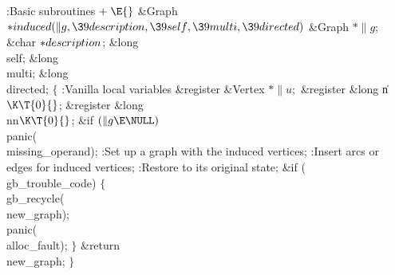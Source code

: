 \B{}:Basic subroutines\X${}\mathrel+\E{}$\6
\1\1\&{Graph} ${}{*}\\{induced}(\|g,\39\\{description},\39\\{self},\39%
\\{multi},\39\\{directed}){}$\6
\&{Graph} ${}{*}\|g{}$;\6
\&{char} ${}{*}\\{description}{}$;\6
\&{long} \\{self};\6
\&{long} \\{multi};\6
\&{long} \\{directed};\2\2\6
${}\{{}$\5
\1:Vanilla local variables\X\5
\hbox{}\6{}\&{register} \&{Vertex} ${}{*}\|u;{}$\6
\&{register} \&{long} \|n${}\K\T{0}{}$;\6
\&{register} \&{long} \\{nn}${}\K\T{0}{}$;\7
\&{if} ${}(\|g\E\NULL){}$\1\5
\\{panic}(\\{missing\_operand});\2\6
:Set up a graph with the induced vertices\X;\6
:Insert arcs or edges for induced vertices\X;\6
:Restore  to its original state\X;\6
\&{if} (\\{gb\_trouble\_code})\5
${}\{{}$\1\6
\\{gb\_recycle}(\\{new\_graph});\6
\\{panic}(\\{alloc\_fault});\6
\4${}\}{}$\2\6
\&{return} \\{new\_graph};\6
\4${}\}{}$\2\par
\fi


